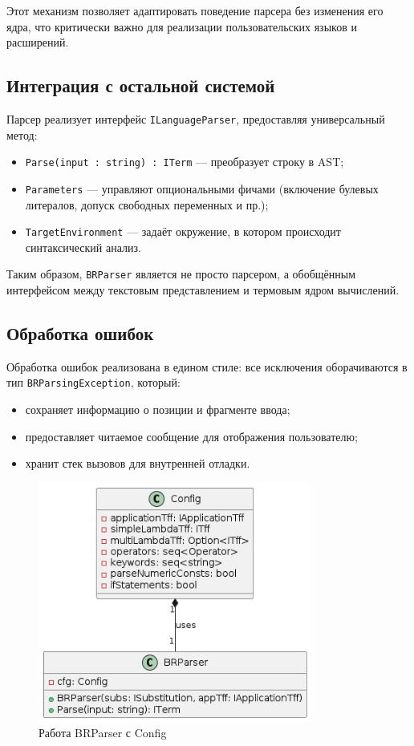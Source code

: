 Этот механизм позволяет адаптировать поведение парсера без изменения его ядра, что критически важно для реализации пользовательских языков и расширений.

\subsection{Интеграция с остальной системой}

Парсер реализует интерфейс \texttt{ILanguageParser}, предоставляя универсальный метод:

\begin{itemize}
  \item \texttt{Parse(input : string) : ITerm} — преобразует строку в AST;
  \item \texttt{Parameters} — управляют опциональными фичами (включение булевых литералов, допуск свободных переменных и пр.);
  \item \texttt{TargetEnvironment} — задаёт окружение, в котором происходит синтаксический анализ.
\end{itemize}

Таким образом, \texttt{BRParser} является не просто парсером, а обобщённым интерфейсом между текстовым представлением и термовым ядром вычислений.

\subsection{Обработка ошибок}

Обработка ошибок реализована в едином стиле: все исключения оборачиваются в тип \texttt{BRParsingException}, который:

\begin{itemize}
  \item сохраняет информацию о позиции и фрагменте ввода;
  \item предоставляет читаемое сообщение для отображения пользователю;
  \item хранит стек вызовов для внутренней отладки.
\end{itemize}

\begin{figure}[h]
  \centering
  \includegraphics[width=0.8\textwidth]{./img/Config.jpg}
  \caption{Работа BRParser с Config}
  \label{fig:config}
\end{figure}


